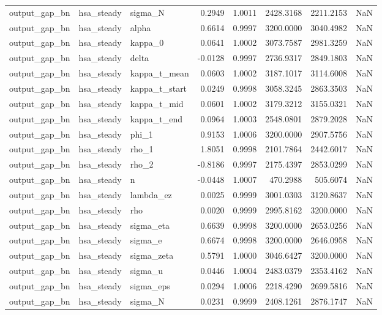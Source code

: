 \begin{tabular}{lllrrrrl}
output\_gap\_bn & hsa\_steady & sigma\_N & 0.2949 & 1.0011 & 2428.3168 & 2211.2153 & NaN \\
output\_gap\_bn & hsa\_steady & alpha & 0.6614 & 0.9997 & 3200.0000 & 3040.4982 & NaN \\
output\_gap\_bn & hsa\_steady & kappa\_0 & 0.0641 & 1.0002 & 3073.7587 & 2981.3259 & NaN \\
output\_gap\_bn & hsa\_steady & delta & -0.0128 & 0.9997 & 2736.9317 & 2849.1803 & NaN \\
output\_gap\_bn & hsa\_steady & kappa\_t\_mean & 0.0603 & 1.0002 & 3187.1017 & 3114.6008 & NaN \\
output\_gap\_bn & hsa\_steady & kappa\_t\_start & 0.0249 & 0.9998 & 3058.3245 & 2863.3503 & NaN \\
output\_gap\_bn & hsa\_steady & kappa\_t\_mid & 0.0601 & 1.0002 & 3179.3212 & 3155.0321 & NaN \\
output\_gap\_bn & hsa\_steady & kappa\_t\_end & 0.0964 & 1.0003 & 2548.0801 & 2879.2028 & NaN \\
output\_gap\_bn & hsa\_steady & phi\_1 & 0.9153 & 1.0006 & 3200.0000 & 2907.5756 & NaN \\
output\_gap\_bn & hsa\_steady & rho\_1 & 1.8051 & 0.9998 & 2101.7864 & 2442.6017 & NaN \\
output\_gap\_bn & hsa\_steady & rho\_2 & -0.8186 & 0.9997 & 2175.4397 & 2853.0299 & NaN \\
output\_gap\_bn & hsa\_steady & n & -0.0448 & 1.0007 & 470.2988 & 505.6074 & NaN \\
output\_gap\_bn & hsa\_steady & lambda\_ez & 0.0025 & 0.9999 & 3001.0303 & 3120.8637 & NaN \\
output\_gap\_bn & hsa\_steady & rho & 0.0020 & 0.9999 & 2995.8162 & 3200.0000 & NaN \\
output\_gap\_bn & hsa\_steady & sigma\_eta & 0.6639 & 0.9998 & 3200.0000 & 2653.0256 & NaN \\
output\_gap\_bn & hsa\_steady & sigma\_e & 0.6674 & 0.9998 & 3200.0000 & 2646.0958 & NaN \\
output\_gap\_bn & hsa\_steady & sigma\_zeta & 0.5791 & 1.0000 & 3046.6427 & 3200.0000 & NaN \\
output\_gap\_bn & hsa\_steady & sigma\_u & 0.0446 & 1.0004 & 2483.0379 & 2353.4162 & NaN \\
output\_gap\_bn & hsa\_steady & sigma\_eps & 0.0294 & 1.0006 & 2218.4290 & 2699.5816 & NaN \\
output\_gap\_bn & hsa\_steady & sigma\_N & 0.0231 & 0.9999 & 2408.1261 & 2876.1747 & NaN \\

\end{tabular}
